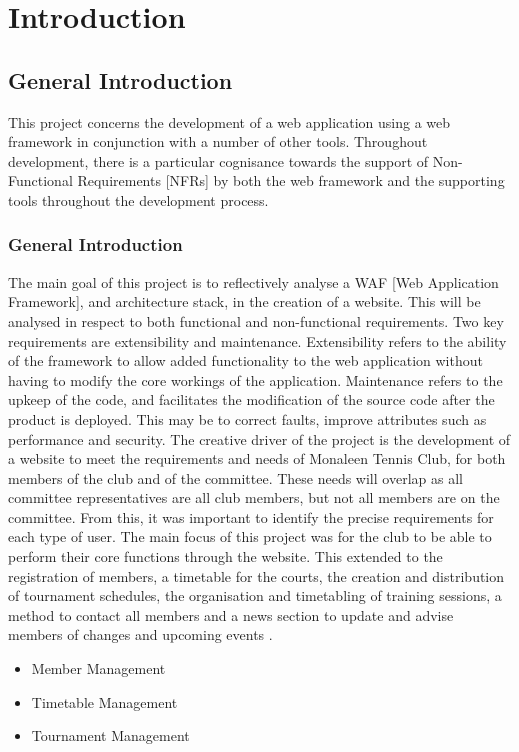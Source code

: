 \chapter{Introduction}
\label{intro}

\section{General Introduction}

This project concerns the development of a web application using a web framework in conjunction with a number of other tools. Throughout development, there is a particular cognisance towards the support of Non-Functional Requirements [NFRs] by both the web framework and the supporting tools throughout the development process.


\subsection{General Introduction}

The main goal of this project is to reflectively analyse a WAF [Web Application Framework], and architecture stack, in the creation of a website. This will be analysed in respect to both functional and non-functional requirements. Two key requirements are extensibility and maintenance. Extensibility refers to the ability of the framework to allow added functionality to the web application without having to modify the core workings of the application. Maintenance refers to the upkeep of the code, and facilitates the modification of the source code after the product is deployed. This may be to correct faults, improve attributes such as performance and security.
The creative driver of the project is the development of a website to meet the requirements and needs of Monaleen Tennis Club, for both members of the club and of the committee. These needs will overlap as all committee representatives are all club members, but not all members are on the committee. From this, it was important to identify the precise requirements for each type of user. The main focus of this project was for the club to be able to perform their core functions through the website. This extended to the registration of members, a timetable for the courts, the creation and distribution of tournament schedules, the organisation and timetabling of training sessions, a method to contact all members and a news section to update and advise members of changes and upcoming events .  

\begin {itemize}
\item	Member Management
\item	Timetable Management
\item	Tournament Management
\end{itemize}


